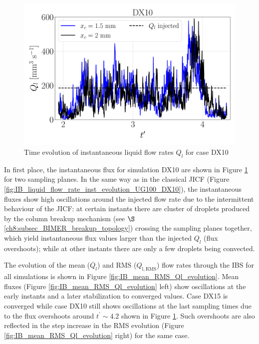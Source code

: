 \begin{figure}[ht]
	\centering
   \includegraphics[scale=0.222]{./part3_applications/figures_ch8_resolved/flow_rates_ibs/inst_Q_iso_x_DX10}
   \vspace*{-0.20in}
\caption{Time evolution of instantaneous liquid flow rates $Q_l$ for case DX10}
\label{fig:IB_liquid_flow_rate_inst_evolution_BIMER}
\end{figure}


In first place, the instantaneous flux for simulation DX10 are shown in Figure \ref{fig:IB_liquid_flow_rate_inst_evolution_BIMER} for two sampling planes. In the same way as in the classical JICF (Figure \ref{fig:IB_liquid_flow_rate_inst_evolution_UG100_DX10}), the instantaneous fluxes show high oscillations around the injected flow rate due to the intermittent behaviour of the JICF: at certain instants there are cluster of droplets produced by the column breakup mechanism (see $\S$\ref{ch8:subsec_BIMER_breakup_topology}) crossing the sampling planes together, which yield instantaneous flux values larger than the injected $Q_l$ (flux overshoots); while at other instants there are only a few droplets being convected.


The evolution of the mean ($\overline{Q}_l$) and RMS ($Q_\mathrm{l,\mathrm{RMS}}$) flow rates through the IBS for all simulations is shown in Figure \ref{fig:IB_mean_RMS_Ql_evolution}. Mean fluxes (Figure \ref{fig:IB_mean_RMS_Ql_evolution} left) show oscillations at the early instants and a later stabilization to converged values. Case DX15 is converged while case DX10 still shows oscillations at the last sampling times due to the flux overshoots around $t^\prime \sim 4.2$ shown in Figure \ref{fig:IB_liquid_flow_rate_inst_evolution_BIMER}. Such overshoots are also reflected in the step increase in the RMS evolution (Figure \ref{fig:IB_mean_RMS_Ql_evolution} right) for the same case. %

